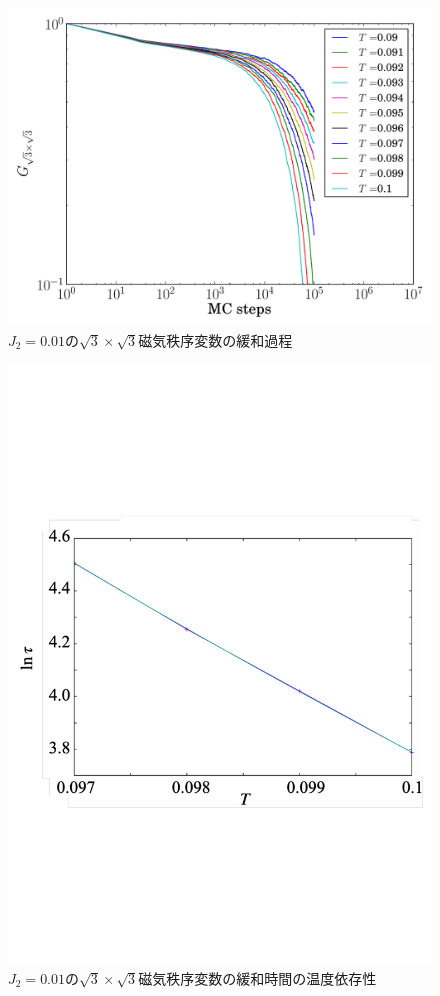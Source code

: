 \documentclass[12pt,titlepage,dvipdfmx]{jarticle}
\begin{document}
\begin{figure}[H]
   \centering
   \includegraphics[width=12cm]{figure/mq_sqrt3_raw_data_j2_0.01.pdf}
   \caption{$J_2=0.01$の$\sqrt{3}\times\sqrt{3}$磁気秩序変数の緩和過程}
\end{figure}

\begin{figure}[H]
   \centering
   \includegraphics[width=12cm]{figure/mq_sqrt3_Tc_j2_0.01.pdf}
   \caption{$J_2=0.01$の$\sqrt{3}\times\sqrt{3}$磁気秩序変数の緩和時間の温度依存性}
\end{figure}
\end{document}
